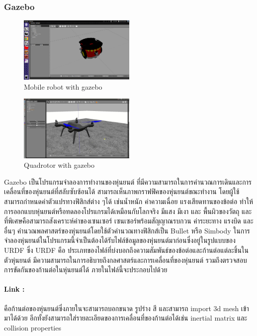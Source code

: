 \subsubsection*{Gazebo}
\begin{figure}[!ht]
    \centering
    \includegraphics[width=0.5\textwidth]{chapter2/images/sim_gazebo1.png}
    \caption{Mobile robot with gazebo}
    \label{fig:sim_gazebo1}
\end{figure}
\begin{figure}[!ht]
    \centering
    \includegraphics[width=0.5\textwidth]{chapter2/images/sim_gazebo2.jpg}
    \caption{Quadrotor with gazebo}
    \label{fig:sim_gazebo2}
\end{figure}
Gazebo เป็นโปรแกรมจำลองการทำงานของหุ่นยนต์ ที่มีความสามารถในการคำนวณการเดินและการเคลื่อนที่ของหุ่นยนต์ที่สลับซับซ้อนได้
สามารถเห็นภาพกราฟฟิคของหุ่นยนต์ขณะทำงาน โดยผู้ใช้สามารถกำหนดค่าตัวแปรทางฟิสิกส์ต่าง ๆได้ เช่นน้ำหนัก ค่าความเฉื่อย แรงเสียดทานของข้อต่อ
ทำให้การออกแบบหุ่นยนต์หรือทดลองโปรแกรมได้เหมือนกับโลกจริง มีแสง มีเงา และ พื้นผิวของวัตถุ และที่พิเศษคือสามารถสังเคราะห์ค่าของเซนเซอร์
เซนเซอร์พร้อมสัญญาณรบกวน ค่าระยะทาง แรงบิด และอื่นๆ คำนวณพลศาสตร์ของหุ่นยนต์โดยใช้ตัวคำนวณทางฟิสิกส์เป็น Bullet หรือ Simbody
ในการจำลองหุ่นยนต์ในโปรแกรมนี้จำเป็นต้องได้รับไฟล์ข้อมูลของหุ่นยนต์มาก่อนซึ่งอยู่ในรูปแบบของ URDF ซึ่ง URDF คือ
ประเภทของไฟล์ที่บ่งบอกถึงความสัมพันธ์ของข้อต่อและก้านต่อแต่ละชิ้นในตัวหุ่นยนต์ มีความสามารถในการอธิบายถึงกลศาสตร์และการเคลื่อนที่ของหุ่นยนต์
รวมถึงตรวจสอบการขัดกันของก้านต่อในหุ่นยนต์ได้ ภายในไฟล์นี้จะประกอบไปด้วย

\paragraph*{Link :}
คือก้านต่อของหุ่นยนต์ซึ่งภายในจะสามารถบอกขนาด รูปร่าง สี และสามารถ import 3d mesh เข้ามาได้ด้วย
อีกทั้งยังสามารถใส่รายละเอียดของการเคลื่อนที่ของก้านต่อได้เช่น inertial matrix และ collision properties

